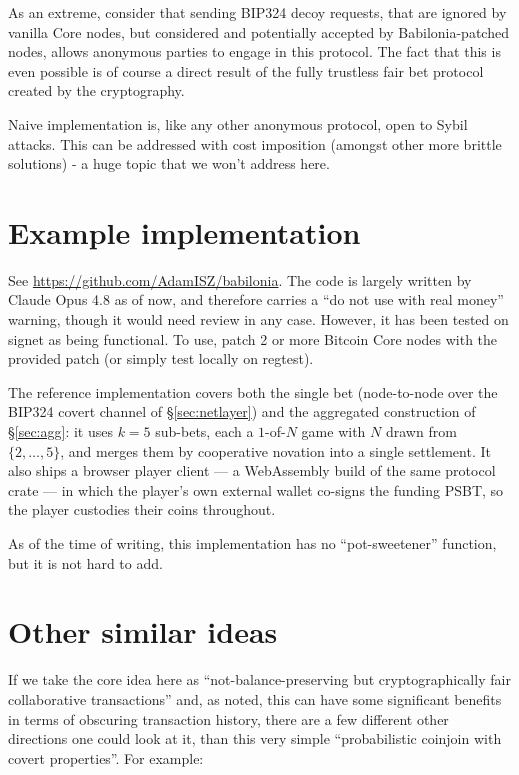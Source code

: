 \documentclass[11pt]{article}
\begin{document}
As an extreme, consider that sending BIP324 decoy requests, that are ignored by vanilla Core nodes, but considered and potentially accepted by Babilonia-patched nodes, allows anonymous parties to engage in this protocol. The fact that this is even possible is of course a direct result of the fully trustless fair bet protocol created by the cryptography.

Naive implementation is, like any other anonymous protocol, open to Sybil attacks. This can be addressed with cost imposition (amongst other more brittle solutions) - a huge topic that we won't address here.


\section{Example implementation}

See \url{https://github.com/AdamISZ/babilonia}. The code is largely written by Claude Opus 4.8 as of now, and therefore carries a ``do not use with real money'' warning, though it would need review in any case. However, it has been tested on signet as being functional. To use, patch 2 or more Bitcoin Core nodes with the provided patch (or simply test locally on regtest).

The reference implementation covers both the single bet (node-to-node over the BIP324 covert channel of \S\ref{sec:netlayer}) and the aggregated construction of \S\ref{sec:agg}: it uses $k=5$ sub-bets, each a $1$-of-$N$ game with $N$ drawn from $\{2,\dots,5\}$, and merges them by cooperative novation into a single settlement. It also ships a browser player client --- a WebAssembly build of the same protocol crate --- in which the player's own external wallet co-signs the funding PSBT, so the player custodies their coins throughout.

As of the time of writing, this implementation has no ``pot-sweetener'' function, but it is not hard to add.

\section{Other similar ideas}
\label{sec:ideas}

If we take the core idea here as ``not-balance-preserving but cryptographically fair collaborative transactions'' and, as noted, this can have some significant benefits in terms of obscuring transaction history, there are a few different other directions one could look at it, than this very simple ``probabilistic coinjoin with covert properties''. For example:
\end{document}
